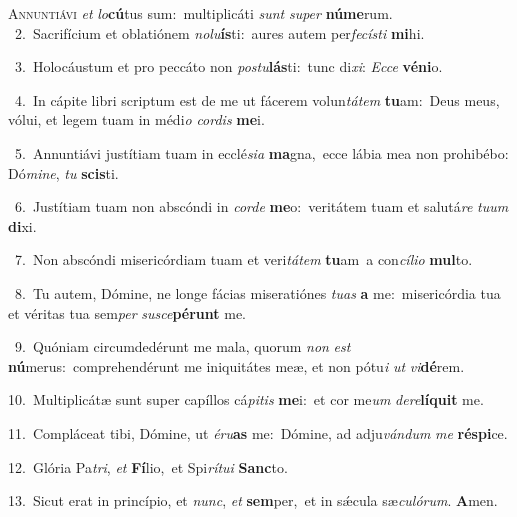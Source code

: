 \lettrine{\initial\textcolor{\initialcolor}{A}}{nnuntiávi} \textit{et} \textit{lo}\-\textbf{cú}tus sum:~\star multiplicáti \textit{sunt} \textit{su}\-\textit{per} \textbf{nú}\-\textbf{me}rum.\\
{\numbfont\textcolor{\numbcolor}{~2.}}~Sacrifícium et oblatiónem \textit{no}\-\textit{lu}\textbf{ís}ti:~\star aures autem per\-\textit{fe}\-\textit{cís}\textit{ti} \textbf{mi}\-hi.\par
{\numbfont\textcolor{\numbcolor}{~3.}}~Holocáustum et pro peccáto non \textit{pos}\-\textit{tu}\textbf{lás}ti:~\star tunc di\-\textit{xi}\-: \textit{Ec}\-\textit{ce} \textbf{vé}\-\textbf{ni}o.\par
{\numbfont\textcolor{\numbcolor}{~4.}}~In cápite libri scriptum est de me ut fácerem volun\-\textit{tá}\-\textit{tem} \textbf{tu}\-am:~\star Deus meus, vólui, et legem tuam in médi\textit{o} \textit{cor}\-\textit{dis} \textbf{me}\-i.\par
{\numbfont\textcolor{\numbcolor}{~5.}}~Annuntiávi justítiam tuam in ecclé\-\textit{si}\-\textit{a} \textbf{ma}\-gna,~\star ecce lábia mea non prohibébo: Dó\-\textit{mi}\-\textit{ne}, \textit{tu} \textbf{scis}\-ti.\par
{\numbfont\textcolor{\numbcolor}{~6.}}~Justítiam tuam non abscóndi in \textit{cor}\-\textit{de} \textbf{me}\-o:~\star veritátem tuam et salutá\textit{re} \textit{tu}\-\textit{um} \textbf{di}\-xi.\par
{\numbfont\textcolor{\numbcolor}{~7.}}~Non abscóndi misericórdiam tuam et veri\-\textit{tá}\-\textit{tem} \textbf{tu}\-am~\star a con\-\textit{cí}\-\textit{li}\textit{o} \textbf{mul}\-to.\par
{\numbfont\textcolor{\numbcolor}{~8.}}~Tu autem, Dómine, ne longe fácias miseratiónes \textit{tu}\-\textit{as} \textbf{a} me:~\star misericórdia tua et véritas tua sem\textit{per} \textit{su}\-\textit{sce}\textbf{pé}\textbf{runt} me.\par
{\numbfont\textcolor{\numbcolor}{~9.}}~Quóniam circumdedérunt me mala, quorum \textit{non} \textit{est} \textbf{nú}\-merus:~\star comprehendérunt me iniquitátes meæ, et non pótu\textit{i} \textit{ut} \textit{vi}\-\textbf{dé}rem.\par
{\numbfont\textcolor{\numbcolor}{10.}}~Multiplicátæ sunt super capíllos cá\-\textit{pi}\-\textit{tis} \textbf{me}\-i:~\star et cor me\textit{um} \textit{de}\-\textit{re}\textbf{lí}\textbf{quit} me.\par
{\numbfont\textcolor{\numbcolor}{11.}}~Compláceat tibi, Dómine, ut \textit{é}\-\textit{ru}\textbf{as} me:~\star Dómine, ad adju\-\textit{ván}\-\textit{dum} \textit{me} \textbf{ré}\-\textbf{spi}ce.\par
{\numbfont\textcolor{\numbcolor}{12.}}~Glória Pa\-\textit{tri}\-, \textit{et} \textbf{Fí}\-lio,~\star et Spi\-\textit{rí}\-\textit{tu}\textit{i} \textbf{Sanc}\-to.\par
{\numbfont\textcolor{\numbcolor}{13.}}~Sicut erat in princípio, et \textit{nunc}\-, \textit{et} \textbf{sem}\-per,~\star et in sǽcula sæ\-\textit{cu}\-\textit{ló}\textit{rum}. \textbf{A}\-men.\par
